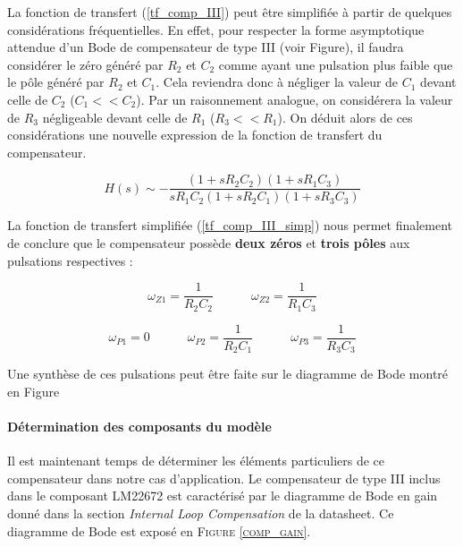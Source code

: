 				La fonction de transfert (\ref{tf_comp_III}) peut être simplifiée 
				à partir de quelques considérations fréquentielles. En effet, pour 
				respecter la forme asymptotique attendue d'un Bode de compensateur 
				de type III (voir Figure), il faudra considérer le zéro généré par 
				$R_2$ et $C_2$ comme ayant une pulsation plus faible que le pôle 
				généré par $R_2$ et $C_1$. 
				Cela reviendra donc à négliger la valeur de $C_1$ devant celle de 
				$C_2$ ($C_1 << C_2$). 
				Par un raisonnement analogue, on considérera la valeur de $R_3$ 
				négligeable devant celle de $R_1$ ($R_3 << R_1$). 
				On déduit alors de ces considérations une nouvelle expression de 
				la fonction de transfert du compensateur.
					
				\begin{equation}
					H(s) \sim -\frac{(1+s R_2 C_2)(1+sR_1 C_3)}
					{sR_1 C_2 (1+sR_2 C_1) (1+sR_3C_3)}
					\label{tf_comp_III_simp}
				\end{equation}
					
				La fonction de transfert simplifiée (\ref{tf_comp_III_simp}) nous 
				permet finalement de conclure que le compensateur possède 
				\textbf{deux zéros} et \textbf{trois pôles} aux pulsations 
				respectives :
					
				\begin{equation}
					\omega_{Z1} = \frac{1}{R_2C_2}
					\quad\quad\quad
					\omega_{Z2} = \frac{1}{R_1C_3}
				\end{equation}
					
				\begin{equation}
					\omega_{P1} = 0
					\quad\quad\quad
					\omega_{P2} = \frac{1}{R_2C_1}
					\quad\quad\quad
					\omega_{P3} = \frac{1}{R_3C_3}
				\end{equation}
					
				Une synthèse de ces pulsations peut être faite sur le diagramme de 
				Bode montré en Figure 					
					
				\paragraph{Détermination des composants du modèle}
				
				Il est maintenant temps de déterminer les éléments particuliers 
				de ce compensateur dans notre cas d'application. Le compensateur 
				de type III inclus dans le composant LM22672 est caractérisé par 
				le diagramme de Bode en gain donné dans la section 
				\textit{Internal Loop Compensation} de la datasheet. Ce diagramme 
				de Bode est exposé en \textsc{Figure \ref{comp_gain}}.
										
